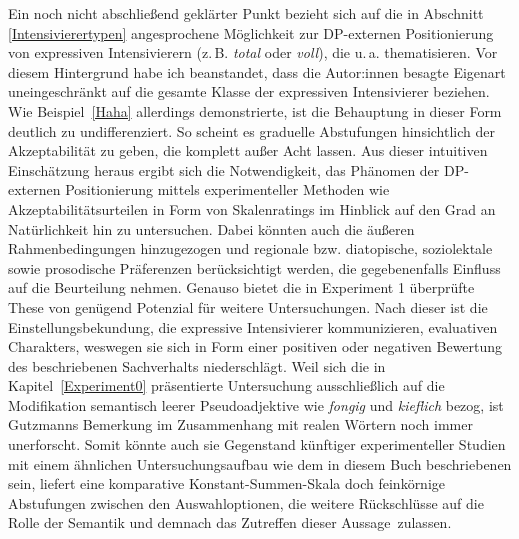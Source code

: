 Ein noch nicht abschließend geklärter Punkt bezieht sich auf die in Abschnitt \ref{Intensivierertypen} angesprochene Möglichkeit zur DP-externen Positionierung von expressiven Intensivierern (z.\,B. \textit{total} oder \textit{voll}), die u.\,a. \mbox{\citet[]{Gutzmann.2012}} thematisieren. Vor diesem Hintergrund habe ich beanstandet, dass die Autor:innen besagte Eigenart uneingeschränkt auf die gesamte Klasse der expressiven Intensivierer beziehen. Wie \mbox{Beispiel \ref{Haha}} allerdings demonstrierte, ist die Behauptung in dieser Form deutlich zu undifferenziert. So scheint es graduelle Abstufungen hinsichtlich der Akzeptabilität zu geben, die \citet[]{Gutzmann.2012} komplett außer Acht lassen. Aus dieser intuitiven Einschätzung heraus ergibt sich die Notwendigkeit, das Phänomen der DP-externen Positionierung mittels experimenteller Methoden wie Akzeptabilitätsurteilen in Form von Skalenratings im Hinblick auf den Grad an Natürlichkeit hin zu untersuchen. Dabei könnten auch die äußeren Rahmenbedingungen hinzugezogen und regionale bzw. diatopische, soziolektale sowie prosodische Präferenzen berücksichtigt werden, die gegebenenfalls Einfluss auf die Beurteilung nehmen. Genauso bietet die in Experiment 1 überprüfte These von \mbox{\citet[135]{Gutzmann.2019a}} genügend Potenzial für weitere Untersuchungen. Nach dieser ist die Einstellungsbekundung, die expressive Intensivierer kommunizieren, evaluativen Charakters, weswegen sie sich in Form einer positiven oder negativen Bewertung des beschriebenen Sachverhalts niederschlägt. Weil sich die in \mbox{Kapitel \ref{Experiment0}} präsentierte Untersuchung ausschließlich auf die Modifikation semantisch leerer Pseudoadjektive wie \textit{fongig} und \textit{kieflich} bezog, ist Gutzmanns Bemerkung im Zusammenhang mit realen Wörtern noch immer unerforscht. Somit könnte auch sie Gegenstand künftiger experimenteller Studien mit einem ähnlichen Untersuchungsaufbau wie dem in diesem Buch beschriebenen sein, liefert eine komparative Konstant-Summen-Skala doch feinkörnige Abstufungen zwischen den Auswahloptionen, die weitere Rückschlüsse auf die Rolle der Semantik und demnach das Zutreffen dieser \mbox{Aussage zulassen}.


